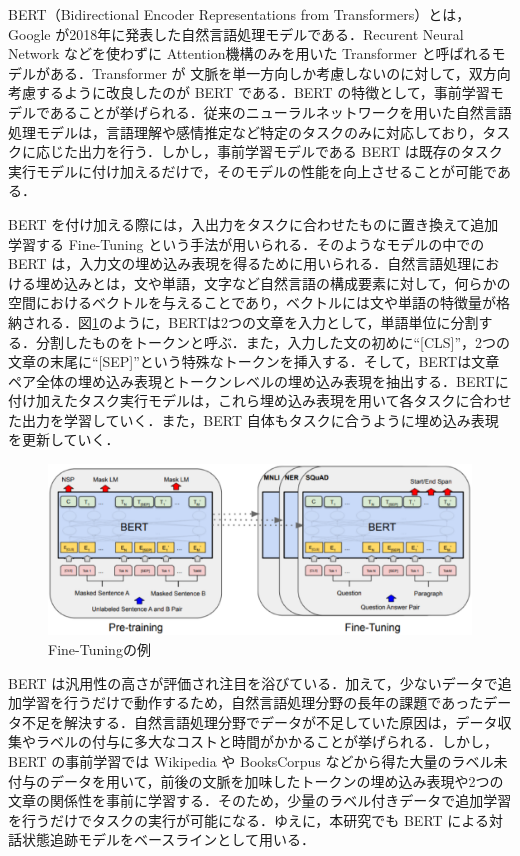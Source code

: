 BERT（Bidirectional Encoder Representations from Transformers）とは，Google が2018年に発表した自然言語処理モデルである\cite{bert}．Recurent Neural Network などを使わずに Attention機構のみを用いた Transformer \cite{transformer} と呼ばれるモデルがある．Transformer が 文脈を単一方向しか考慮しないのに対して，双方向考慮するように改良したのが BERT である．BERT の特徴として，事前学習モデルであることが挙げられる．従来のニューラルネットワークを用いた自然言語処理モデルは，言語理解や感情推定など特定のタスクのみに対応しており，タスクに応じた出力を行う．しかし，事前学習モデルである BERT は既存のタスク実行モデルに付け加えるだけで，そのモデルの性能を向上させることが可能である．
\par
BERT を付け加える際には，入出力をタスクに合わせたものに置き換えて追加学習する Fine-Tuning という手法が用いられる．そのようなモデルの中での BERT は，入力文の埋め込み表現を得るために用いられる．自然言語処理における埋め込みとは，文や単語，文字など自然言語の構成要素に対して，何らかの空間におけるベクトルを与えることであり，ベクトルには文や単語の特徴量が格納される．図\ref{fig:bert_fine}のように，BERTは2つの文章を入力として，単語単位に分割する．分割したものをトークンと呼ぶ．また，入力した文の初めに“[CLS]”，2つの文章の末尾に“[SEP]”という特殊なトークンを挿入する．そして，BERTは文章ペア全体の埋め込み表現とトークンレベルの埋め込み表現を抽出する．BERTに付け加えたタスク実行モデルは，これら埋め込み表現を用いて各タスクに合わせた出力を学習していく．また，BERT 自体もタスクに合うように埋め込み表現を更新していく．
\par
  
\begin{figure}[tbh]
  \centering
  \includegraphics[width=15cm]{chapter3/bert_fine.eps}
  \caption{Fine-Tuningの例\cite{bert}}
  \label{fig:bert_fine}
\end{figure}

BERT は汎用性の高さが評価され注目を浴びている．加えて，少ないデータで追加学習を行うだけで動作するため，自然言語処理分野の長年の課題であったデータ不足を解決する．自然言語処理分野でデータが不足していた原因は，データ収集やラベルの付与に多大なコストと時間がかかることが挙げられる．しかし，BERT の事前学習では Wikipedia や BooksCorpus などから得た大量のラベル未付与のデータを用いて，前後の文脈を加味したトークンの埋め込み表現や2つの文章の関係性を事前に学習する．そのため，少量のラベル付きデータで追加学習を行うだけでタスクの実行が可能になる．ゆえに，本研究でも BERT による対話状態追跡モデルをベースラインとして用いる．